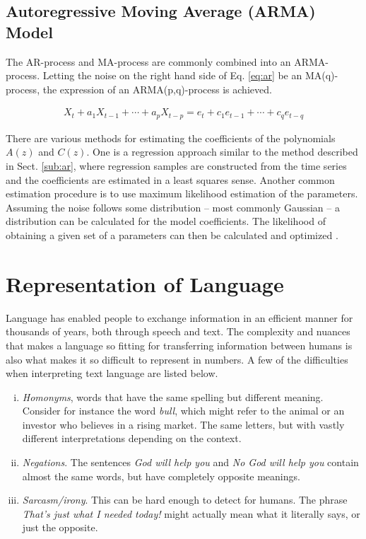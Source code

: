 \subsection{Autoregressive Moving Average (ARMA) Model}


The AR-process and MA-process are commonly combined into an ARMA-process. Letting the noise on the right hand side of Eq. \ref{eq:ar} be an MA(q)-process, the expression of an ARMA(p,q)-process is achieved. 

\begin{align}
    X_t + a_1 X_{t-1} + \cdots + a_pX_{t-p} = e_t + c_1 e_{t-1} + \cdots + c_q e_{t-q}
    \label{eq:arma}
\end{align}

There are various methods for estimating the coefficients of the polynomials $A(z)$ and $C(z)$. One is a regression approach similar to the method described in Sect. \ref{sub:ar}, where regression samples are constructed from the time series and the coefficients are estimated in a least squares sense. Another common estimation procedure is to use maximum likelihood estimation of the parameters. Assuming the noise follows some distribution -- most commonly Gaussian -- a distribution can be calculated for the model coefficients. The likelihood of obtaining a given set of a parameters can then be calculated and optimized \citep{hamilton1994time}. 

\section{Representation of Language}

Language has enabled people to exchange information in an efficient manner for thousands of years, both through speech and text. The complexity and nuances that makes a language so fitting for transferring information between humans is also what makes it so difficult to represent in numbers. A few of the difficulties when interpreting text language are listed below. 
\begin{enumerate}[i)]
    \item \textit{Homonyms}, words that have the same spelling but different meaning. Consider for instance the word \textit{bull}, which might refer to the animal or an investor who believes in a rising market. The same letters, but with vastly different interpretations depending on the context. 
    \item \textit{Negations}. The sentences \textit{God will help you} and \textit{No God will help you} contain almost the same words, but have completely opposite meanings. 
    \item \textit{Sarcasm/irony}. This can be hard enough to detect for humans. The phrase \textit{That's just what I needed today!} might actually mean what it literally says, or just the opposite.
\end{enumerate}

